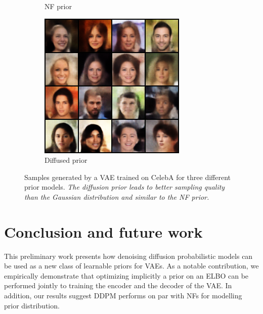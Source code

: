 \documentclass{article}
\begin{document}
\begin{figure}
\begin{subfigure}{.33\textwidth}
    \caption{NF prior}\label{fig:celeba_NF}
    \end{subfigure}
    \begin{subfigure}{.33\textwidth}
    \includegraphics[width=.99\textwidth]{figures/DDPM_celeba.png}
    \caption{Diffused prior}\label{fig:celeba_DDPM}
    \end{subfigure}
    \caption{Samples generated by a VAE trained on CelebA for three different prior models. \textit{The diffusion prior leads to better sampling quality than the Gaussian distribution and similar to the NF prior.}}\label{fig:CelebA}
\end{figure}

\section{Conclusion and future work}
This preliminary work presents how denoising diffusion probabilistic models can be used as a new class of learnable priors for VAEs. As a notable contribution, we empirically demonstrate that optimizing implicitly a prior on an ELBO can be performed jointly to training the encoder and the decoder of the VAE. In addition, our results suggest DDPM performs on par with NFs for modelling prior distribution. 
\end{document}
